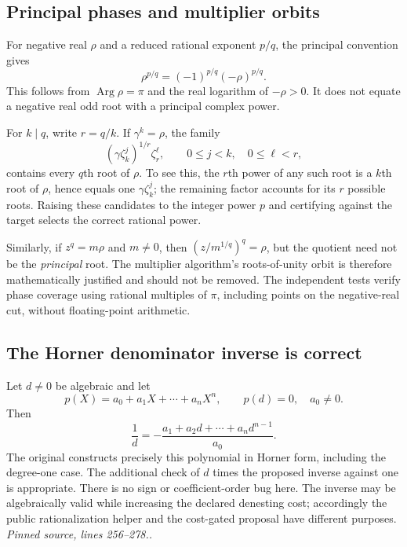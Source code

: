 \documentclass[11pt,a4paper]{article}
\newcommand{\code}[1]{\texttt{\detokenize{#1}}}
\newcommand{\Arg}{\operatorname{Arg}}
\newcommand{\src}[1]{\textit{Pinned source, lines #1.}}
\theoremstyle{remark}\newtheorem{remark}[theorem]{Remark}
\begin{document}
\subsection{Principal phases and multiplier orbits}
For negative real $\rho$ and a reduced rational exponent $p/q$, the principal convention gives
\begin{equation}\label{eq:negative}
 \rho^{p/q}=(-1)^{p/q}(-\rho)^{p/q}.
\end{equation}
This follows from $\Arg\rho=\pi$ and the real logarithm of $-\rho>0$. It does not equate a negative real odd root with a principal complex power.

For $k\mid q$, write $r=q/k$. If $\gamma^k=\rho$, the family
\begin{equation}\label{eq:kummer}
 \left(\gamma\zeta_k^j\right)^{1/r}\zeta_r^\ell,
 \qquad 0\le j<k,\quad 0\le\ell<r,
\end{equation}
contains every $q$th root of $\rho$. To see this, the $r$th power of any such root is a $k$th root of $\rho$, hence equals one $\gamma\zeta_k^j$; the remaining factor accounts for its $r$ possible roots. Raising these candidates to the integer power $p$ and certifying against the target selects the correct rational power.

Similarly, if $z^q=m\rho$ and $m\ne0$, then $(z/m^{1/q})^q=\rho$, but the quotient need not be the \emph{principal} root. The multiplier algorithm's roots-of-unity orbit is therefore mathematically justified and should not be removed. The independent tests verify phase coverage using rational multiples of $\pi$, including points on the negative-real cut, without floating-point arithmetic.

\subsection{The Horner denominator inverse is correct}
Let $d\ne0$ be algebraic and let
\[
 p(X)=a_0+a_1X+\cdots+a_nX^n,
 \qquad p(d)=0,\quad a_0\ne0.
\]
Then
\begin{equation}\label{eq:inverse}
 \frac1d=-\frac{a_1+a_2d+\cdots+a_nd^{n-1}}{a_0}.
\end{equation}
The original \code{Fold} constructs precisely this polynomial in Horner form, including the degree-one case. The additional check of $d$ times the proposed inverse against one is appropriate. There is no sign or coefficient-order bug here. The inverse may be algebraically valid while increasing the declared denesting cost; accordingly the public rationalization helper and the cost-gated proposal have different purposes. \src{256--278.}
\end{document}
